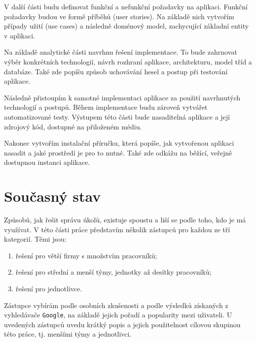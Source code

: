 \documentclass[thesis=B,czech]{FITthesis}[2012/06/26]
\begin{document}
		V další části budu definovat funkční a nefunkční požadavky na aplikaci. Funkční požadavky budou ve formě příběhů (user stories). Na základě nich vytvořím případy užití (use cases) a následně doménový model, zachycující základní entity v aplikaci.
		
		Na základě analytické části navrhnu řešení implementace. To bude zahrnovat výběr konkrétních technologií, návrh rozhraní aplikace, architekturu, model tříd a databáze. Také zde popíšu způsob uchovávání hesel a postup při testování aplikace.

		Následně přistoupím k samotné implementaci aplikace za použití navrhnutých technologií a postupů. Během implementace budu zároveň vytvářet automatizované testy. Výstupem této části bude nasaditelná aplikace a její zdrojový kód, dostupné na přiloženém médiu. 
		
		Nakonec vytvořím instalační příručku, která popíše, jak vytvořenou aplikaci nasadit a jaké prostředí je pro to nutné. Také zde odkážu na běžící, veřejně dostupnou instanci aplikace.
		
\chapter{Současný stav}
	\label{chapter:current-state}

	Způsobů, jak řešit správu úkolů, existuje spoustu a liší se podle toho, kdo je má využívat. V této části práce představím několik zástupců pro každou ze tří kategorií. Těmi jsou:
	\begin{enumerate}
	  \item řešení pro větší firmy s množstvím pracovníků;
	  \item řešení pro střední a menší týmy, jednotky až desítky pracovníků;
	  \item řešení pro jednotlivce.
	\end{enumerate}

	Zástupce vybírám podle osobních zkušenosti a podle výsledků získaných z vyhledávače \texttt{Google}, na základě jejich pořadí a popularity mezi uživateli. U uvedených zástupců uvedu krátký popis a jejich použitelnost cílovou skupinou této práce, tj. menšími týmy a jednotlivci.
\end{document}

